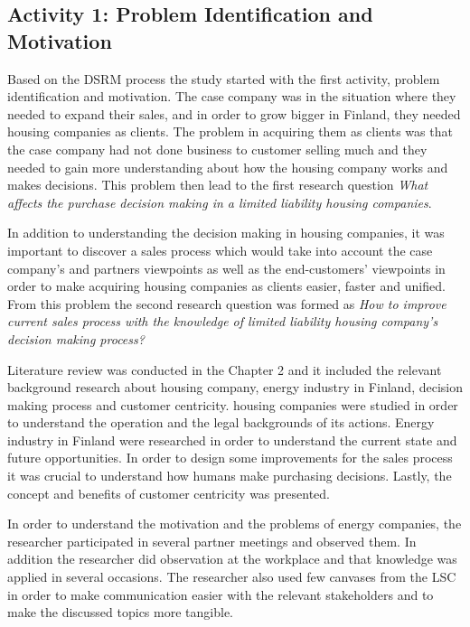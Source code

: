 \subsection{Activity 1: Problem Identification and Motivation}

Based on the DSRM process the study started with the first activity, problem identification and motivation. The case company was in the situation where they needed to expand their sales, and in order to grow bigger in Finland, they needed housing companies as clients. The problem in acquiring them as clients was that the case company had not done business to customer selling much and they needed to gain more understanding about how the housing company works and makes decisions. This problem then lead to the first research question \emph{What affects the purchase decision making in a limited liability housing companies}.

In addition to understanding the decision making in housing companies, it was important to discover a sales process which would take into account the case company's and partners viewpoints as well as the end-customers' viewpoints in order to make acquiring housing companies as clients easier, faster and unified. From this problem the second research question was formed as \emph{How to improve current sales process with the knowledge of limited liability housing company’s decision making process?}

Literature review was conducted in the Chapter 2 and it included the relevant background research about housing company, energy industry in Finland, decision making process and customer centricity. housing companies were studied in order to understand the operation and the legal backgrounds of its actions. Energy industry in Finland were researched in order to understand the current state and future opportunities. In order to design some improvements for the sales process it was crucial to understand how humans make purchasing decisions. Lastly, the concept and benefits of customer centricity was presented.

In order to understand the motivation and the problems of energy companies, the researcher participated in several partner meetings and observed them. In addition the researcher did observation at the workplace and that knowledge was applied in several occasions. The researcher also used few canvases from the LSC in order to make communication easier with the relevant stakeholders and to make the discussed topics more tangible.

